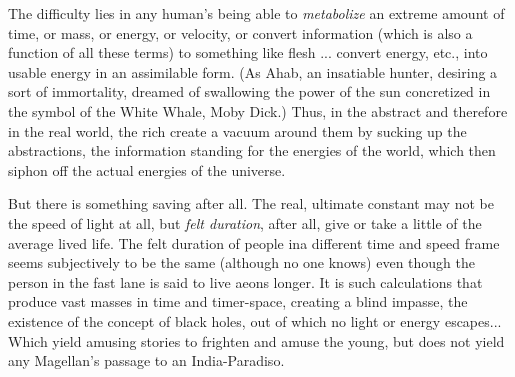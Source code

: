 The difficulty lies in any human's being able to \emph{metabolize} an extreme amount of time, or mass, or energy, or velocity, or convert information (which is also a function of all these terms) to something like flesh ... convert energy, etc., into usable energy in an assimilable form. (As Ahab, an insatiable hunter, desiring a sort of immortality, dreamed of swallowing the power of the sun concretized in the symbol of the White Whale, Moby Dick.) Thus, in the abstract and therefore in the real world, the rich create a vacuum around them by sucking up the abstractions, the information standing for the energies of the world, which then siphon off the actual energies of the universe.

But there is something saving after all. The real, ultimate constant may not be the speed of light at all, but \emph{felt duration}, after all, give or take a little of the average lived life. The felt duration of people ina different time and speed frame seems subjectively to be the same (although no one knows) even though the person in the fast lane is said to live aeons longer. It is such calculations that produce vast masses in time and timer-space, creating a blind impasse, the existence of the concept of black holes, out of which no light or energy escapes... Which yield amusing stories to frighten and amuse the young, but does not yield any Magellan's passage to an India-Paradiso.

